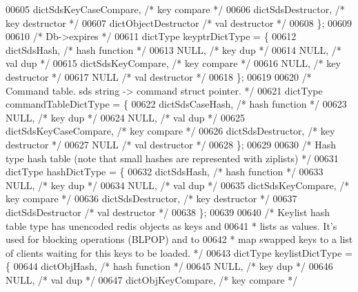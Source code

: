 \begin{DoxyCode}
{{{{{00605     dictSdsKeyCaseCompare,      \textcolor{comment}{/* key compare */}
00606     dictSdsDestructor,          \textcolor{comment}{/* key destructor */}
00607     dictObjectDestructor        \textcolor{comment}{/* val destructor */}
00608 \};
00609 
00610 \textcolor{comment}{/* Db->expires */}
00611 dictType keyptrDictType = \{
00612     dictSdsHash,                \textcolor{comment}{/* hash function */}
00613     NULL,                       \textcolor{comment}{/* key dup */}
00614     NULL,                       \textcolor{comment}{/* val dup */}
00615     dictSdsKeyCompare,          \textcolor{comment}{/* key compare */}
00616     NULL,                       \textcolor{comment}{/* key destructor */}
00617     NULL                        \textcolor{comment}{/* val destructor */}
00618 \};
00619 
00620 \textcolor{comment}{/* Command table. sds string -> command struct pointer. */}
00621 dictType commandTableDictType = \{
00622     dictSdsCaseHash,            \textcolor{comment}{/* hash function */}
00623     NULL,                       \textcolor{comment}{/* key dup */}
00624     NULL,                       \textcolor{comment}{/* val dup */}
00625     dictSdsKeyCaseCompare,      \textcolor{comment}{/* key compare */}
00626     dictSdsDestructor,          \textcolor{comment}{/* key destructor */}
00627     NULL                        \textcolor{comment}{/* val destructor */}
00628 \};
00629 
00630 \textcolor{comment}{/* Hash type hash table (note that small hashes are represented with ziplists) */}
00631 dictType hashDictType = \{
00632     dictSdsHash,                \textcolor{comment}{/* hash function */}
00633     NULL,                       \textcolor{comment}{/* key dup */}
00634     NULL,                       \textcolor{comment}{/* val dup */}
00635     dictSdsKeyCompare,          \textcolor{comment}{/* key compare */}
00636     dictSdsDestructor,          \textcolor{comment}{/* key destructor */}
00637     dictSdsDestructor           \textcolor{comment}{/* val destructor */}
00638 \};
00639 
00640 \textcolor{comment}{/* Keylist hash table type has unencoded redis objects as keys and}
00641 \textcolor{comment}{ * lists as values. It's used for blocking operations (BLPOP) and to}
00642 \textcolor{comment}{ * map swapped keys to a list of clients waiting for this keys to be loaded. */}
00643 dictType keylistDictType = \{
00644     dictObjHash,                \textcolor{comment}{/* hash function */}
00645     NULL,                       \textcolor{comment}{/* key dup */}
00646     NULL,                       \textcolor{comment}{/* val dup */}
00647     dictObjKeyCompare,          \textcolor{comment}{/* key compare */}
}}}}}
\end{DoxyCode}
